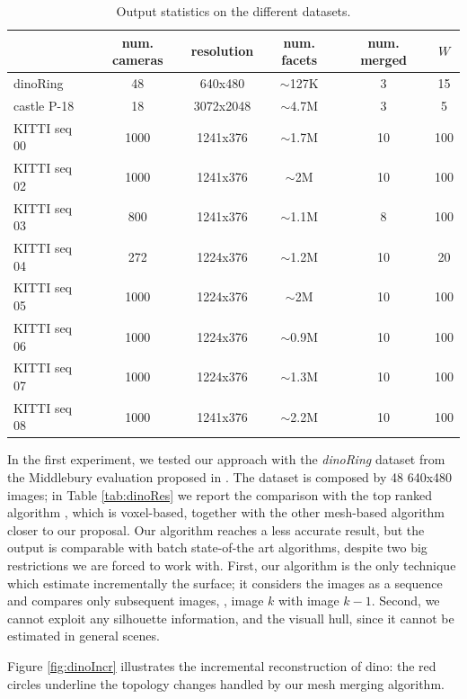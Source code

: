 \begin{table}[t]
\normalsize
\centering
\setlength{\tabcolsep}{1px}
  \caption{Output statistics on the different datasets.}
  \label{fig:expData}
\begin{tabular}{lccccc}
&num. cameras& resolution&num. facets& num. merged &$W$ \\
\hline
dinoRing&48&640x480&$\sim$127K&3&15\\
castle P-18&18&3072x2048&$\sim$4.7M&3&5\\
KITTI seq 00&1000& 1241x376&$\sim$1.7M&10&100\\
KITTI seq 02&1000& 1241x376&$\sim$2M&10&100\\
KITTI seq 03&800& 1241x376&$\sim$1.1M&8&100\\
KITTI seq 04&272& 1224x376&$\sim$1.2M&10&20\\
KITTI seq 05&1000& 1224x376&$\sim$2M&10&100\\
KITTI seq 06&1000& 1224x376&$\sim$0.9M&10&100\\
KITTI seq 07&1000& 1224x376&$\sim$1.3M&10&100\\
KITTI seq 08&1000& 1241x376&$\sim$2.2M&10&100\\
\end{tabular}
\end{table}

In the first experiment, we tested our approach with the \emph{dinoRing} dataset  from the Middlebury evaluation proposed in \cite{seitz2006comparison}. 
The dataset is composed by 48 640x480 images; in Table \ref{tab:dinoRes} we report the comparison with the top ranked algorithm \cite{savinov2016semantic}, which is voxel-based, together with the other mesh-based algorithm closer to our proposal.
Our algorithm reaches a less accurate result, but  the output is comparable with batch state-of-the art algorithms, despite two big restrictions we are forced to work with.
First, our algorithm is the only technique  which estimate incrementally the surface; it considers the images as a sequence and compares only subsequent images, \ie, image $k$ with image $k-1$.
Second, we cannot exploit any silhouette information, and the visuall hull, since it cannot be estimated in general scenes.

Figure \ref{fig:dinoIncr} illustrates the incremental reconstruction of dino: the red circles underline the topology changes handled by our mesh merging algorithm.

